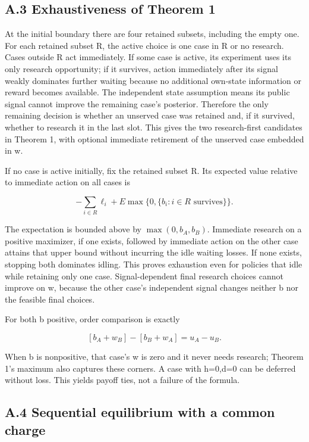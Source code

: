 \documentclass[
  11pt,
]{article}
\begin{document}
\subsection{A.3 Exhaustiveness of Theorem
1}\label{a.3-exhaustiveness-of-theorem-1}

At the initial boundary there are four retained subsets, including the
empty one. For each retained subset R, the active choice is one case in
R or no research. Cases outside R act immediately. If some case is
active, its experiment uses its only research opportunity; if it
survives, action immediately after its signal weakly dominates further
waiting because no additional own-state information or reward becomes
available. The independent state assumption means its public signal
cannot improve the remaining case's posterior. Therefore the only
remaining decision is whether an unserved case was retained and, if it
survived, whether to research it in the last slot. This gives the two
research-first candidates in Theorem 1, with optional immediate
retirement of the unserved case embedded in w.

If no case is active initially, fix the retained subset R. Its expected
value relative to immediate action on all cases is

\[-\sum_{i\in R}\ell_i+E\max\{0,\{b_i:i\in R\text{ survives}\}\}.\]

The expectation is bounded above by \(\max(0,b_A,b_B)\). Immediate
research on a positive maximizer, if one exists, followed by immediate
action on the other case attains that upper bound without incurring the
idle waiting losses. If none exists, stopping both dominates idling.
This proves exhaustion even for policies that idle while retaining only
one case. Signal-dependent final research choices cannot improve on w,
because the other case's independent signal changes neither b nor the
feasible final choices.

For both b positive, order comparison is exactly

\[[b_A+w_B]-[b_B+w_A]=u_A-u_B.\]

When b is nonpositive, that case's w is zero and it never needs
research; Theorem 1's maximum also captures these corners. A case with
h=0,d=0 can be deferred without loss. This yields payoff ties, not a
failure of the formula.

\subsection{A.4 Sequential equilibrium with a common
charge}\label{a.4-sequential-equilibrium-with-a-common-charge}
\end{document}
